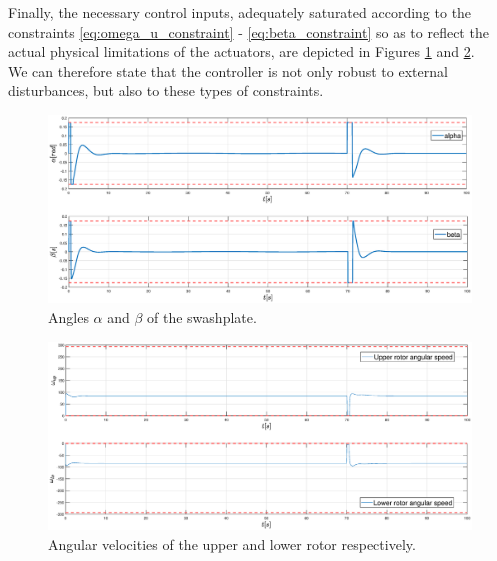 Finally, the necessary control inputs, adequately saturated according to the constraints \ref{eq:omega_u_constraint} - \ref{eq:beta_constraint} so as to reflect the actual physical limitations of the actuators, are depicted in Figures \ref{fig:BS_angles} and \ref{fig:BS_omega}. 
\\ We can therefore state that the controller is not only robust to external disturbances, but also to these types of constraints.
\begin{figure}[H]
    \centering
    \includegraphics[scale=0.2]{figures/BS_angles}
    \caption{Angles $\alpha$ and $\beta$ of the swashplate.}
    \label{fig:BS_angles}
\end{figure}
\begin{figure}[H]
    \centering
    \includegraphics[scale=0.2]{figures/BS_omega}
    \caption{Angular velocities of the upper and lower rotor respectively.}
    \label{fig:BS_omega}
\end{figure}

